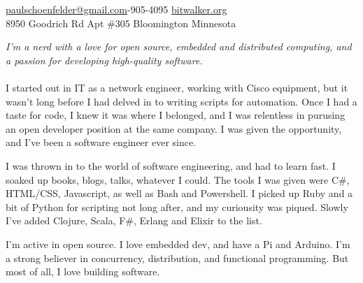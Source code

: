 \documentclass[10pt,a4paper]{article}
\begin{document}
\sloppy  %



\nobreakvspace{0.3em}  %

\noindent\href{mailto:paulschoenfelder@gmail.com}{paulschoenfelder\mbox{}@\mbox{}gmail.com}-905-4095\sbull
\href{http://bitwalker.org}{bitwalker.org}
\\
8950 Goodrich Rd\sbull
Apt \#305\sbull
Bloomington\sbull
Minnesota

\spacedhrule{0.9em}{-0.4em}  %


\vspace{-1.3em}  %
\begin{multicols}{2}  %
\noindent \emph{I'm a nerd with a love for open source, embedded and distributed computing, and a passion for developing high-quality software.}
\\
\\
I started out in IT as a network engineer, working with Cisco equipment, but it wasn't long before I had delved in to writing scripts for automation. Once I had a taste for code, I knew it was where I belonged, and I was relentless in purusing an open developer position at the same company. I was given the opportunity, and I've been a software engineer ever since.

I was thrown in to the world of software engineering, and had to learn fast. I soaked up books, blogs, talks, whatever I could. The tools I was given were C\#, HTML/CSS, Javascript, as well as Bash and Powershell. I picked up Ruby and a bit of Python for scripting not long after, and my curiousity was piqued. Slowly I've added Clojure, Scala, F\#, Erlang and Elixir to the list.

I'm active in open source. I love embedded dev, and have a Pi and Arduino. I'm a strong believer in concurrency, distribution, and functional programming. But most of all, I love building software.
\end{multicols}
\end{document}
